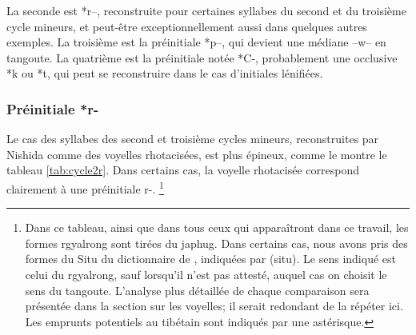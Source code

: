 \documentclass[oldfontcommands,twoside,a4paper,11pt,draft]{memoir}
\begin{document}
La seconde est *r--, reconstruite pour certaines syllabes du second et du troisième cycle mineurs, et peut-être exceptionnellement aussi dans quelques autres exemples.
La troisième est la préinitiale *p--, qui devient une médiane --w-- en tangoute.
La quatrième est la préinitiale notée *C-, probablement une occlusive *k ou *t, qui peut se reconstruire dans le cas d'initiales lénifiées.

\subsubsection{Préinitiale *r-} \label{subsubsec:rpreinitiale}

Le cas des syllabes des second et troisième cycles mineurs, reconstruites par Nishida comme des voyelles rhotacisées, est plus épineux, comme le montre le tableau \ref{tab:cycle2r}. Dans certains cas, la voyelle rhotacisée correspond clairement à une préinitiale r-. \footnote{Dans ce tableau, ainsi que dans tous ceux qui apparaîtront dans ce travail, les formes rgyalrong sont tirées du japhug. Dans certains cas, nous avons pris des formes du Situ du dictionnaire de \citet{huangsun02}, indiquées par (situ). Le sens indiqué est celui du rgyalrong, sauf lorsqu'il n'est pas attesté, auquel cas on choisit le sens du tangoute. L'analyse plus détaillée de chaque comparaison sera présentée dans la section sur les voyelles; il serait redondant de la répéter ici. Les emprunts potentiels au tibétain sont indiqués par une astérisque.}
\end{document}
